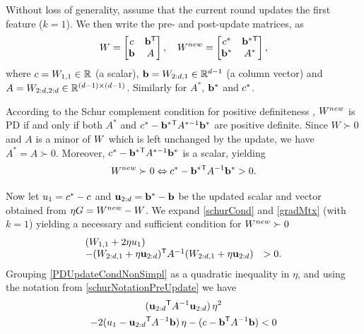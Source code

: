 \documentclass{article}
\begin{document}
Without loss of generality, assume that the current round updates
the first feature ($k = 1$).  We then write the pre- and post-update
matrices, as
\begin{equation}
  {W} = \left[ \begin{matrix} c & \mathbf{b}{}^\mathsf{T} \\ \mathbf{b} & A \end{matrix} \right],
  \quad
  {{W^{new}}} = \left[ \begin{matrix} c^* & \mathbf{b}^*{}^\mathsf{T} \\ \mathbf{b}^* & A^* \end{matrix} \right],
  \label{schurNotationPreUpdate}
\end{equation}
 where $c = {W}_{1,1} \in \mathbb{R}$ (a scalar), $\mathbf{b} = {W}_{2:d,1} \in
\mathbb{R}^{d-1}$ (a column vector) and $A = {W}_{2:d,2:d} \in \mathbb{R}^{(d-1)
\times (d-1)}$. Similarly for $A^*$, $\mathbf{b}^*$ and $c^*$.


According to the Schur complement condition for positive definiteness
\citep[p. 650]{boyd2004convex}, ${{W^{new}}}$ is PD if and only if both
$A^*$ and $c^* - \mathbf{b}^*{}^\mathsf{T} A^{*-1} \mathbf{b}^*$ are positive definite.
Since $W \succ 0$ and $A$ is a minor of ${W}$ which is left unchanged by the update, we have $A^* =
A \succ 0$.  Moreover, $c^* - \mathbf{b}^*{}^\mathsf{T} A^{*-1} \mathbf{b}^*$ is a
scalar, yielding
\begin{equation}
  {{W^{new}}} \succ  0 \Leftrightarrow  c^* - \mathbf{b}^*{}^\mathsf{T} A^{-1} \mathbf{b}^* >  0.
  \label{schurCond}
\end{equation}
%

%
Now let ${u}_{1} = c^* - c$ and $\mathbf{u}_{2:d} = \mathbf{b}^* - \mathbf{b}$ be the updated scalar and vector
obtained from $\eta G = {{W^{new}}} - {W}$. We expand \eqref{schurCond} and
\eqref{gradMtx} (with $k=1$) yielding a necessary and sufficient condition for ${{W^{new}}} \succ 0$
\begin{equation}
  \begin{array}{ll} 
    ({W}_{1,1} + 2\eta {u}_{1}) \\
    -({W}_{2:d,1} + \eta \mathbf{u}_{2:d}){}^\mathsf{T} A^{-1} ({W}_{2:d,1} + \eta \mathbf{u}_{2:d})  & > 0.
  \end{array}
  \label{PDUpdateCondNonSimpl}
\end{equation}
Grouping \eqref{PDUpdateCondNonSimpl} as a quadratic inequality in $\eta$, and using the notation from \eqref{schurNotationPreUpdate} we have
\begin{multline}
\label{PDUpdateCondQuadForm}
(\mathbf{u}_{2:d}{}^\mathsf{T} A^{-1} \mathbf{u}_{2:d}) \, \eta^2 
\\-2({u}_{1} - \mathbf{u}_{2:d}{}^\mathsf{T} A^{-1} \mathbf{b}) \,\eta 
-(c - \mathbf{b}{}^\mathsf{T}  A^{-1} \mathbf{b}) < 0 
\end{multline}
\end{document}
